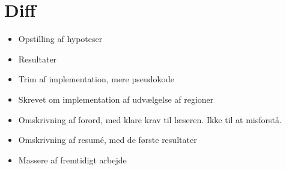 {
\section*{Diff}
\begin{itemize}
    \item Opstilling af hypoteser
    \item Resultater
    \item Trim af implementation, mere pseudokode
    \item Skrevet om implementation af udvælgelse af regioner
    \item Omskrivning af forord, med klare krav til læseren. Ikke
        til at misforstå.
    \item Omskrivning af resumé, med de første resultater
    \item Massere af fremtidigt arbejde
\end{itemize}
}

